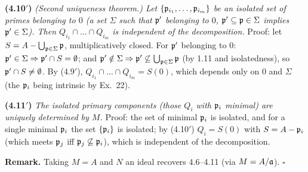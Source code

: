 \documentclass[11pt]{article}
\begin{document}
\textbf{(4.10$'$)} \emph{(Second uniqueness theorem.) Let $\{\mathfrak p_{i_1},\dots,\mathfrak p_{i_m}\}$ be an isolated set of primes belonging to $0$ (a set $\Sigma$ such that $\mathfrak p'$ belonging to $0$, $\mathfrak p'\subseteq\mathfrak p\in\Sigma$ implies $\mathfrak p'\in\Sigma$). Then $Q_{i_1}\cap\dots\cap Q_{i_m}$ is independent of the decomposition.}
Proof: let $S=A-\bigcup_{\mathfrak p\in\Sigma}\mathfrak p$, multiplicatively closed. For $\mathfrak p'$ belonging to $0$: $\mathfrak p'\in\Sigma\Rightarrow\mathfrak p'\cap S=\emptyset$; and $\mathfrak p'\notin\Sigma\Rightarrow\mathfrak p'\not\subseteq\bigcup_{\mathfrak p\in\Sigma}\mathfrak p$ (by 1.11 and isolatedness), so $\mathfrak p'\cap S\ne\emptyset$. By (4.9$'$), $Q_{i_1}\cap\dots\cap Q_{i_m}=S(0)$, which depends only on $0$ and $\Sigma$ (the $\mathfrak p_i$ being intrinsic by Ex.~22).

\textbf{(4.11$'$)} \emph{The isolated primary components (those $Q_i$ with $\mathfrak p_i$ minimal) are uniquely determined by $M$.}
Proof: the set of minimal $\mathfrak p_i$ is isolated, and for a single minimal $\mathfrak p_i$ the set $\{\mathfrak p_i\}$ is isolated; by (4.10$'$) $Q_i=S(0)$ with $S=A-\mathfrak p_i$ (which meets $\mathfrak p_j$ iff $\mathfrak p_j\not\subseteq\mathfrak p_i$), which is independent of the decomposition.

\textbf{Remark.} Taking $M=A$ and $N$ an ideal recovers 4.6--4.11 (via $M=A/\mathfrak a$). \hfill$\square$
\end{document}
